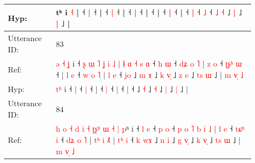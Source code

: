 \documentclass[10pt]{article}
\DeclareRobustCommand{\hl}[1]{{\textcolor{red}{#1}}}
\begin{document}
\begin{longtable}{ll}
 \\
Hyp: & tʰ i \hl{}\hl{˧} |\hl{}\hl{} ˧\hl{}\hl{} \hl{|} ˧\hl{}\hl{}\hl{}\hl{}\hl{}\hl{}\hl{}\hl{}\hl{}\hl{}\hl{}\hl{}\hl{} |\hl{}\hl{} ˧\hl{}\hl{} \hl{|} ˧\hl{}\hl{}\hl{}\hl{}\hl{}\hl{}\hl{}\hl{}\hl{}\hl{}\hl{}\hl{}\hl{} |\hl{}\hl{}\hl{}\hl{}\hl{}\hl{} ˧\hl{}\hl{} \hl{|} ˧\hl{}\hl{}\hl{}\hl{}\hl{}\hl{} |\hl{}\hl{}\hl{}\hl{} ˧\hl{}\hl{}\hl{}\hl{}\hl{}\hl{}\hl{}\hl{}\hl{}\hl{}\hl{}\hl{}\hl{} |\hl{}\hl{}\hl{}\hl{} ˧\hl{}\hl{} \hl{|} ˧\hl{}\hl{}\hl{}\hl{}\hl{}\hl{}\hl{}\hl{}\hl{}\hl{}\hl{}\hl{}\hl{}\hl{}\hl{}\hl{}\hl{}\hl{}\hl{}\hl{} |\hl{}\hl{}\hl{}\hl{} ˧\hl{}\hl{} \hl{|} ˧\hl{}\hl{} \hl{˩} ˧ \hl{}\hl{}\hl{˩} \hl{˧} ˩ \hl{}\hl{|} ˩\hl{}\hl{} \hl{|} ˩ |
 \\
\midrule
Utterance ID: & 83 \\
Ref: & \hl{ə}\hl{ }\hl{˧}\hl{ }\hl{ʝ} i ˧\hl{ }\hl{ʂ}\hl{ }\hl{ɯ}\hl{ }\hl{˥}\hl{ }\hl{ʝ}\hl{ }\hl{i}\hl{ }\hl{˩} |\hl{ }\hl{ɬ}\hl{ }\hl{ɑ}\hl{ }\hl{˧}\hl{ }\hl{s}\hl{ }\hl{ɑ} ˧\hl{ }\hl{h} \hl{ɯ} ˧\hl{ }\hl{d}\hl{ʑ}\hl{ }\hl{o}\hl{ }\hl{˥} |\hl{ }\hl{z}\hl{ }\hl{o} ˧\hl{ }\hl{ʈ}\hl{ʂ}\hl{ʰ} \hl{ɯ} ˧ |\hl{ }\hl{l}\hl{ }\hl{e} ˧\hl{ }\hl{w}\hl{ }\hl{o}\hl{ }\hl{˥} |\hl{ }\hl{l}\hl{ }\hl{e} ˧\hl{ }\hl{j}\hl{o} ˩\hl{ }\hl{m} \hl{ɤ} ˩\hl{ }\hl{k} \hl{v}\hl{̩} ˩\hl{ }\hl{z} \hl{e} ˩\hl{ }\hl{t}\hl{s} \hl{ɯ} ˩ |\hl{ }\hl{m}\hl{ }\hl{v}\hl{̩}\hl{ }\hl{˩}
 \\
Hyp: & \hl{}\hl{}\hl{}\hl{t}\hl{ʰ} i ˧\hl{}\hl{}\hl{}\hl{}\hl{}\hl{}\hl{}\hl{}\hl{}\hl{}\hl{}\hl{} |\hl{}\hl{}\hl{}\hl{}\hl{}\hl{}\hl{}\hl{}\hl{}\hl{} ˧\hl{}\hl{} \hl{|} ˧\hl{}\hl{}\hl{}\hl{}\hl{}\hl{}\hl{} |\hl{}\hl{}\hl{}\hl{} ˧\hl{}\hl{}\hl{}\hl{} \hl{|} ˧ |\hl{}\hl{}\hl{}\hl{} ˧\hl{}\hl{}\hl{}\hl{}\hl{}\hl{} |\hl{}\hl{}\hl{}\hl{} ˧\hl{}\hl{}\hl{} ˩\hl{}\hl{} \hl{˧} ˩\hl{}\hl{} \hl{}\hl{˧} ˩\hl{}\hl{} \hl{|} ˩\hl{}\hl{}\hl{} \hl{|} ˩ |\hl{}\hl{}\hl{}\hl{}\hl{}\hl{}\hl{}
 \\
\midrule
Utterance ID: & 84 \\
Ref: & \hl{h}\hl{ }\hl{o}\hl{ }\hl{˧}\hl{ }\hl{d}\hl{ }\hl{i}\hl{ }\hl{˧}\hl{ }\hl{ʈ}\hl{ʂ}\hl{ʰ}\hl{ }\hl{ɯ}\hl{ }\hl{˧}\hl{ }\hl{|}\hl{ }\hl{p}ʰ i ˧\hl{ }\hl{l} \hl{e} ˧\hl{ }\hl{p} \hl{o} ˧\hl{ }\hl{p}\hl{ }\hl{o}\hl{ }\hl{˥}\hl{ }\hl{b}\hl{ }\hl{i}\hl{ }\hl{˩} |\hl{ }\hl{l}\hl{ }\hl{e} ˧\hl{ }\hl{t}\hl{ɕ}\hl{ʰ} \hl{i} ˧\hl{ }\hl{d}\hl{ʑ}\hl{ }\hl{o}\hl{ }\hl{˥} |\hl{ }\hl{t}\hl{ʰ}\hl{ }\hl{i} \hl{˩}\hl{˥} |\hl{ }\hl{t}\hl{ʰ}\hl{ }\hl{i} ˧\hl{ }\hl{k}\hl{ }\hl{w}\hl{ɤ} ˩\hl{ }\hl{n} \hl{i} ˩\hl{ }\hl{g} \hl{v}\hl{̩} ˩\hl{ }\hl{k} \hl{v}\hl{̩} ˩\hl{ }\hl{t}\hl{s} \hl{ɯ} ˩ |\hl{ }\hl{m}\hl{ }\hl{v}\hl{̩}\hl{ }\hl{˩}

\end{longtable}
\end{document}
